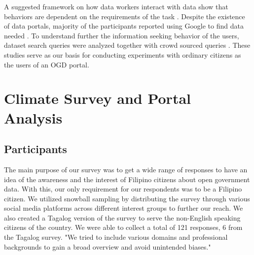 \documentclass{sigchi}
\begin{document}
A suggested framework on how data workers interact with data show that behaviors are dependent on the requirements of the task \cite{koesten2017trials}. Despite the existence of data portals, majority of the participants reported using Google to find data needed \cite{koesten2017trials}. To understand further the information seeking behavior of the users, dataset search queries were analyzed together with crowd sourced queries \cite{kacprzak2019characterising}. These studies serve as our basis for conducting experiments with ordinary citizens as the users of an OGD portal. 

\section{Climate Survey and Portal Analysis}

\subsection{Participants}
The main purpose of our survey was to get a wide range of responses to have an idea of the awareness and the interest of Filipino citizens about open government data. With this, our only requirement for our respondents was to be a Filipino citizen. We utilized snowball sampling by distributing the survey through various social media platforms across different interest groups to further our reach. We also created a Tagalog version of the survey to serve the non-English speaking citizens of the country. We were able to collect a total of 121 responses, 6 from the Tagalog survey. "We tried to include various domains and professional backgrounds to gain a broad overview and avoid unintended biases."
\end{document}
